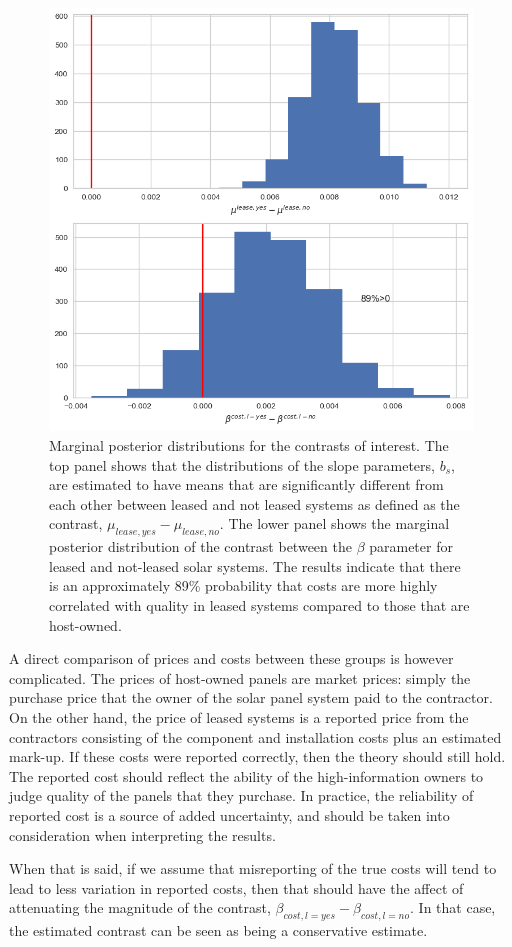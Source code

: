 \documentclass[12pt]{article}
\begin{document}
\begin{figure}
  \centering
  \includegraphics[width=.6\linewidth]{figures/bayes_hypos.png}
  \caption{Marginal posterior distributions for the contrasts of interest. The top panel shows that the distributions of the slope parameters, $b_s$, are estimated to have means that are significantly different from each other between leased and not leased systems as defined as the contrast, $\mu_{lease, yes} - \mu_{lease, no}$. The lower panel shows the marginal posterior distribution of the contrast between the $\beta$ parameter for leased and not-leased solar systems. The results indicate that there is an approximately 89\% probability that costs are more highly correlated with quality in leased systems compared to those that are host-owned.}
  \label{fig:contrasts}
\end{figure}

A direct comparison of prices and costs between these groups is however complicated. The prices of host-owned panels are market prices: simply the purchase price that the owner of the solar panel system paid to the contractor. On the other hand, the price of leased systems is a reported price from the contractors consisting of the component and installation costs plus an estimated mark-up. If these costs were reported correctly, then the theory should still hold. The reported cost should reflect the ability of the high-information owners to judge quality of the panels that they purchase. In practice, the reliability of reported cost is a source of added uncertainty, and should be taken into consideration when interpreting the results.

When that is said, if we assume that misreporting of the true costs will tend to lead to less variation in reported costs, then that should have the affect of attenuating the magnitude of the contrast, $\beta_{cost, l=yes} - \beta_{cost, l=no}$. In that case, the estimated contrast can be seen as being a conservative estimate.
\end{document}
